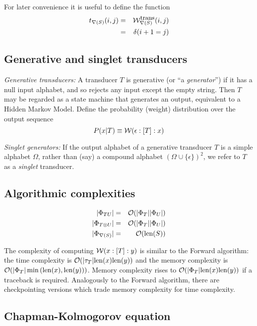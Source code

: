 \documentclass{article}
\newcommand\gappedalphabet[1]{(\Omega_{#1} \cup \{\epsilon\})}
\newcommand\gapsquared{\gappedalphabet{}^2}
\newcommand\wtrans[4]{#1(#2 : [#3] : #4)}
\newcommand\compose{}
\newcommand\fork{\otimes}
\newcommand\recognize{\nabla}
\newcommand\States{\Phi}
\newcommand\statesof[1]{\States_{#1}}
\newcommand\Transitions{\tau}
\newcommand\transitionsof[1]{\Transitions_{#1}}
\newcommand\weight{{\cal W}}
\newcommand\weightfunof[1]{\weight_{#1}}
\newcommand\transweightfun[1]{\weightfunof{#1}^{\mbox{\small trans}}}
\newcommand\numberofstates[1]{|\statesof{#1}|}
\newcommand\numberoftransitions[1]{|\transitionsof{#1}|}
\newcommand\seqlen[1]{\mbox{len}(#1)}
\newcommand\order[1]{{\cal O}(#1)}
\newcommand\profTrans[1]{t_{#1}}
\begin{document}
For later convenience it is useful to define the function
\begin{eqnarray*}
\profTrans{\recognize(S)}(i,j) & = & \transweightfun{\recognize(S)}(i,j) \\
& = & \delta(i+1 = j)
\end{eqnarray*}

\subsection{Generative and singlet transducers}

{\em Generative transducers:}
A transducer $T$ is generative (or ``a {\em generator}'') if it has a null input alphabet, and so rejects any input except the empty string.
Then $T$ may be regarded as a state machine that generates an output, equivalent to a Hidden Markov Model.
Define the probability (weight) distribution over the output sequence
\[
P(x|T) \equiv \wtrans{\weight}{\epsilon}{T}{x}
\]

{\em Singlet generators:}
If the output alphabet of a generative transducer $T$ is a simple alphabet $\Omega$, rather than (say) a compound alphabet $\gapsquared$,
we refer to $T$ as a {\em singlet} transducer.

\subsection{Algorithmic complexities}
\begin{eqnarray*}
\numberofstates{T \compose U} & = & \order{\numberofstates{T} \numberofstates{U}} \\
\numberofstates{T \fork U} & = & \order{\numberofstates{T} \numberofstates{U}} \\
\numberofstates{\recognize(S)} & = & \order{\seqlen{S}}
\end{eqnarray*}

The complexity of computing $\wtrans{\weight}{x}{T}{y}$ is similar to the Forward algorithm:
the time complexity is $\order{\numberoftransitions{T} \seqlen{x} \seqlen{y}}$ and
the memory complexity is $\order{\numberofstates{T} \min\left(\seqlen{x},\seqlen{y}\right)}$.
Memory complexity rises to $\order{\numberofstates{T} \seqlen{x} \seqlen{y}}$ if a traceback is required.
Analogously to the Forward algorithm, there are checkpointing versions which trade memory complexity for time complexity.


\subsection{Chapman-Kolmogorov equation}
\end{document}
